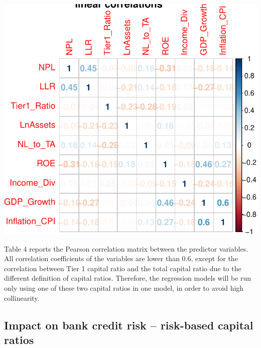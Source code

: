 \documentclass{article}
\begin{document}
\begin{center}\includegraphics{preprint_files/figure-latex/correlation-1} \end{center}

Table 4 reports the Pearson correlation matrix between the predictor
variables. All correlation coefficients of the variables are lower than
0.6, except for the correlation between Tier 1 capital ratio and the
total capital ratio due to the different definition of capital ratios.
Therefore, the regression models will be run only using one of these two
capital ratios in one model, in order to avoid high collinearity.

\hypertarget{impact-on-bank-credit-risk-risk-based-capital-ratios}{%
\subsection{Impact on bank credit risk -- risk-based capital
ratios}\label{impact-on-bank-credit-risk-risk-based-capital-ratios}}
\end{document}
